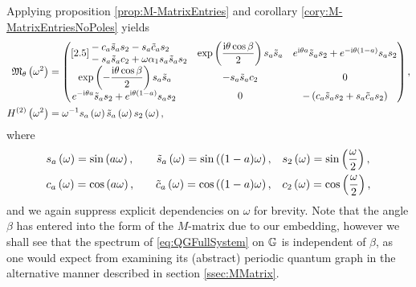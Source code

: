 Applying proposition \ref{prop:M-MatrixEntries} and corollary \ref{cory:M-MatrixEntriesNoPoles} yields
\begin{align*} 
	\mathfrak{M}_\theta\left( \omega^2 \right) &=
	\begin{pmatrix}[2.5]
		\begin{split}
			&-c_a \tilde{s}_a s_2 
			- s_a \tilde{c}_a s_2  \\
			&- s_a \tilde{s}_a c_2
			+ \omega\alpha_1 s_a \tilde{s}_a s_2
		\end{split} &
		\exp\left( \dfrac{\mathrm{i}\theta\cos\beta}{2} \right)s_a \tilde{s}_a &
		e^{\mathrm{i}\theta a}\tilde{s}_a s_2 + e^{-\mathrm{i}\theta(1-a)}s_a s_2 \\
		\begin{split}		
			& \exp\left( -\dfrac{\mathrm{i}\theta\cos\beta}{2} \right)s_a \tilde{s}_a 
		\end{split} &
		-s_a \tilde{s}_a c_2 &
		0 \\
		\begin{split}
			& e^{-\mathrm{i}\theta a}\tilde{s}_a s_2 + e^{\mathrm{i}\theta(1-a)}s_a s_2 
		\end{split} &
		0 &
		-\left( c_a \tilde{s}_a s_2 + s_a \tilde{c}_a s_2 \right)
	\end{pmatrix}, \\
	H^{(2)}\left( \omega^2 \right) &= \omega^{-1} s_a\left( \omega \right) \tilde{s}_a\left( \omega \right) s_2\left( \omega \right),
\end{align*}
where
\begin{alignat*}{3}
	& s_a\left( \omega \right) = \sin\left( a\omega \right), \quad
	& \tilde{s}_a\left( \omega \right) = \sin\left( (1-a)\omega \right), \quad
	& s_2\left( \omega \right) = \sin\left( \frac{\omega}{2} \right), \\
	& c_a\left( \omega \right) = \cos\left( a\omega \right), \quad
	& \tilde{c}_a\left( \omega \right) = \cos\left( (1-a)\omega \right), \quad
	& c_2\left( \omega \right) = \cos\left( \frac{\omega}{2} \right),
\end{alignat*}
and we again suppress explicit dependencies on $\omega$ for brevity.
Note that the angle $\beta$ has entered into the form of the $M$-matrix due to our embedding, however we shall see that the spectrum of \eqref{eq:QGFullSystem} on $\mathbb{G}$ is independent of $\beta$, as one would expect from examining its (abstract) periodic quantum graph in the alternative manner described in section \ref{ssec:MMatrix}.

